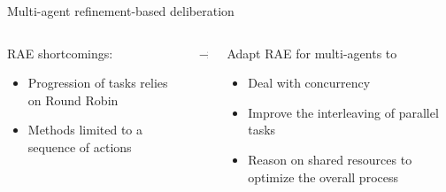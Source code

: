 \begin{frame}{Multi-agent refinement-based deliberation}
    \begin{columns}[t]
        \begin{column}{0.45\textwidth}
            RAE shortcomings:
            \begin{itemize}
                \item Progression of tasks relies on Round Robin
                \item Methods limited to a sequence of actions
            \end{itemize}
        \end{column}
        \begin{column}{0.1\textwidth}
            $\rightarrow$

        \end{column}
        \begin{column}{0.45\textwidth}
            Adapt RAE for multi-agents to
            \begin{itemize}
                \item Deal with concurrency
                \item Improve the interleaving of parallel tasks
                \item Reason on shared resources to optimize the overall process
            \end{itemize}
        \end{column}
    \end{columns}
\end{frame}